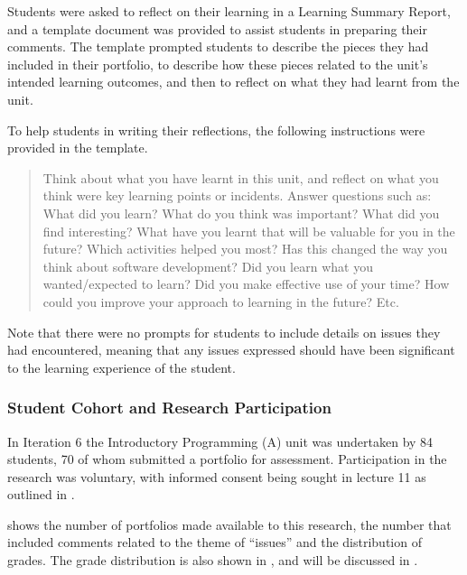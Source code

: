 Students were asked to reflect on their learning in a Learning Summary Report, and a template document was provided to assist students in preparing their comments. The template prompted students to describe the pieces they had included in their portfolio, to describe how these pieces related to the unit's intended learning outcomes, and then to reflect on what they had learnt from the unit.

To help students in writing their reflections, the following instructions were provided in the template. 
\begin{quote}
  \small
  Think about what you have learnt in this unit, and reflect on what you think were key learning points or incidents. Answer questions such as: What did you learn? What do you think was important? What did you find interesting? What have you learnt that will be valuable for you in the future? Which activities helped you most? Has this changed the way you think about software development? Did you learn what you wanted/expected to learn? Did you make effective use of your time? How could you improve your approach to learning in the future? Etc. 
\end{quote}

Note that there were no prompts for students to include details on issues they had encountered, meaning that any issues expressed should have been significant to the learning experience of the student.

\subsubsection{Student Cohort and Research Participation} %
\label{sub:issues_student_cohort}

In Iteration 6 the Introductory Programming (A) unit was undertaken by 84 students, 70 of whom submitted a portfolio for assessment. Participation in the research was voluntary, with informed consent being sought in lecture 11 as outlined in .

 shows the number of portfolios made available to this research, the number that included comments related to the theme of ``issues'' and the distribution of grades. The grade distribution is also shown in , and will be discussed in .

